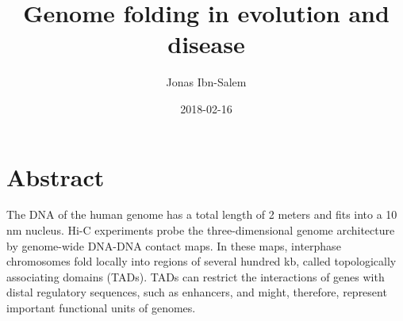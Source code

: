 \documentclass[a4paper,twoside=true,openright,parskip=full,chapterprefix=true,11pt,headings=normal,bibliography=totoc,listof=totoc,titlepage=on,captions=tableabove,draft=false]{scrreprt}
\title{Genome folding in evolution and disease}
\author{Jonas Ibn-Salem}
\date{2018-02-16}
\theoremstyle{definition}
\theoremstyle{definition}
\theoremstyle{definition}
\theoremstyle{remark}
\begin{document}




\pagestyle{empty}				%
\cleardoublepage

\pagestyle{plain}				%
\cleardoublepage
%
%

\setcounter{page}{1}			%
\pagestyle{maincontentstyle} 	%

{
\setcounter{tocdepth}{3}
\tableofcontents
}
\hypertarget{abstract}{%
\chapter*{Abstract}\label{abstract}}

The DNA of the human genome has a total length of 2 meters and fits into
a 10 nm nucleus. Hi-C experiments probe the three-dimensional genome
architecture by genome-wide DNA-DNA contact maps. In these maps,
interphase chromosomes fold locally into regions of several hundred kb,
called topologically associating domains (TADs). TADs can restrict the
interactions of genes with distal regulatory sequences, such as
enhancers, and might, therefore, represent important functional units of
genomes.
\end{document}
